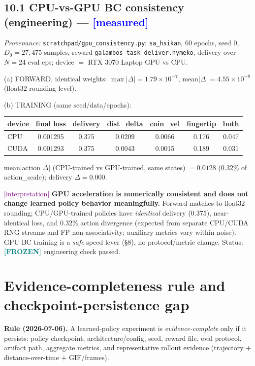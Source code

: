 \documentclass[11pt]{article}
\newcommand{\meas}{\textcolor{blue}{[measured]}}
\newcommand{\interp}{\textcolor{purple}{[interpretation]}}
\newcommand{\frozen}{\textcolor{teal}{\textbf{[FROZEN]}}}
\newcommand{\fn}[1]{\texttt{#1}}
\begin{document}
\subsection*{10.1 CPU-vs-GPU BC consistency (engineering) --- \meas}
\emph{Provenance:} \fn{scratchpad/gpu\_consistency.py}; \fn{sa\_hsikan}, $60$ epochs, seed $0$, $D_0=27{,}475$
samples, reward \fn{galambos\_task\_deliver.hymeko}, delivery over $N=24$ eval eps; device $=$ RTX 3070 Laptop GPU
vs CPU.

(a) FORWARD, identical weights: $\max|\Delta| = 1.79\times10^{-7}$, $\text{mean}|\Delta| = 4.55\times10^{-8}$
(float32 rounding level).

(b) TRAINING (same seed/data/epochs):
\begin{center}\begin{tabular}{lcccccc}
\toprule
device & final loss & delivery & dist\_delta & coin\_vel & fingertip & both\\
\midrule
CPU & 0.001295 & 0.375 & 0.0209 & 0.0066 & 0.176 & 0.047\\
CUDA & 0.001293 & 0.375 & 0.0043 & 0.0015 & 0.189 & 0.031\\
\bottomrule
\end{tabular}\end{center}
mean$|$action $\Delta|$ (CPU-trained vs GPU-trained, same states) $= 0.0128$ ($0.32\%$ of action\_scale);
delivery $\Delta = 0.000$.

\interp{} \textbf{GPU acceleration is numerically consistent and does not change learned policy behavior
meaningfully.} Forward matches to float32 rounding; CPU/GPU-trained policies have \emph{identical} delivery
($0.375$), near-identical loss, and $0.32\%$ action divergence (expected from separate CPU/CUDA RNG streams and FP
non-associativity; auxiliary metrics vary within noise). GPU BC training is a \emph{safe} speed lever (\S8), no
protocol/metric change. Status: \frozen{} engineering check passed.

\section{Evidence-completeness rule and checkpoint-persistence gap}
\textbf{Rule (2026-07-06).} A learned-policy experiment is \emph{evidence-complete} only if it persists: policy
checkpoint, architecture/config, seed, reward file, eval protocol, artifact path, aggregate metrics, and
representative rollout evidence (trajectory $+$ distance-over-time $+$ GIF/frames).
\end{document}
